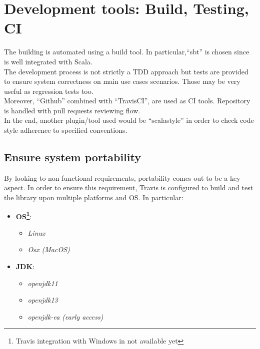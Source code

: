 \section{Development tools: Build, Testing, CI}

The building is automated using a build tool. In particular,``sbt'' is chosen since is well integrated with Scala.
\\
The development process is not strictly a TDD approach but tests are provided to ensure system correctness on main use cases scenarios. Those may be very useful as regression tests too. 
\\
Moreover, ``Github'' combined with ``TravisCI'', are used as CI tools. Repository is handled with pull requests reviewing flow.
\\
In the end, another plugin/tool used would be ``scalastyle'' in order to check code style adherence to specified conventions.

\subsection{Ensure system portability}

By looking to non functional requirements, portability comes out to be a key aspect. In order to ensure this requirement, Travis is configured to build and test the library upon multiple platforms and OS. In particular:
\begin{itemize}
\item \textbf{OS\footnote{Travis integration with Windows in not available yet}}: 
  \begin{itemize}
  \item \textit{Linux}
  \item \textit{Osx (MacOS)}
  \end{itemize}
\item \textbf{JDK}:
  \begin{itemize}
  \item \textit{openjdk11}
  \item \textit{openjdk13}
  \item \textit{openjdk-ea (early access)}
  \end{itemize} 
\end{itemize}  











 